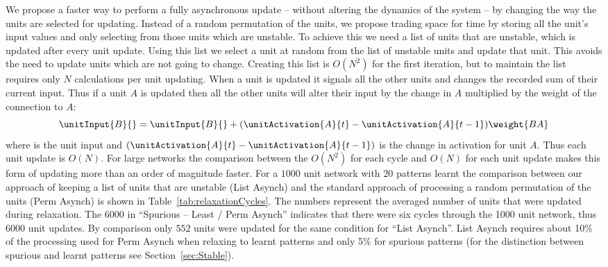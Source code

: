 We propose a faster way to perform a fully asynchronous update -- without altering the dynamics of the system -- by changing the way the units are selected for updating.  Instead of a random permutation of the units, we propose trading space for time by storing all the unit's input values and only selecting from those units which are unstable.  To achieve this we need a list of units that are unstable, which is updated after every unit update.  Using this list we select a unit at random from the list of unstable units and update that unit.  This avoids the need to update units which are not going to change. Creating this list is $O(N^2)$ for the first iteration, but to maintain the list requires only $N$ calculations per unit updating.  When a unit is updated it signals all the other units and changes the recorded sum of their current input.  Thus if a unit $A$ is updated then all the other units will alter their input by the change in $A$ multiplied by the weight of the connection to $A$:
\begin{equation}
	\unitInput{B}{} = \unitInput{B}{} + (\unitActivation{A}{t} - \unitActivation{A}{t-1})\weight{BA}  	
\end{equation}
where  is the unit input and $(\unitActivation{A}{t} - \unitActivation{A}{t-1})$ is the change in activation for unit $A$.  Thus each unit update is $O(N)$.  For large networks the comparison between the $O(N^2)$ for each cycle and $O(N)$ for each unit update makes this form of updating more than an order of magnitude faster. For a $1000$ unit network  with $20$ patterns learnt the comparison between our approach of keeping a list of units that are unstable (List Asynch) and the standard approach of processing a random permutation of the units (Perm Asynch) is shown in Table~\ref{tab:relaxationCycles}.  The numbers represent the averaged number of units that were updated during relaxation.  The $6000$ in ``Spurious -- Least / Perm Asynch'' indicates that there were six cycles through the 1000 unit network, thus $6000$ unit updates.  By comparison only $552$ units were updated for the same condition for ``List Asynch''. List Asynch requires about 10\% of the processing used for Perm Asynch when relaxing to learnt patterns and only 5\% for spurious patterns (for the distinction between spurious and learnt patterns see Section~\ref{sec:Stable}).


